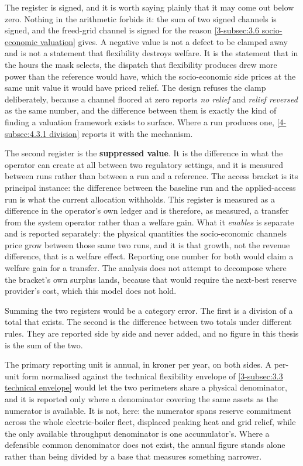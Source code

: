 The register is signed, and it is worth saying plainly that it may come out below zero. Nothing in the arithmetic forbids it: the sum of two signed channels is signed, and the freed-grid channel is signed for the reason \autoref{3-subsec:3.6 socio-economic valuation} gives. A negative value is not a defect to be clamped away and is not a statement that flexibility destroys welfare. It is the statement that in the hours the mask selects, the dispatch that flexibility produces drew more power than the reference would have, which the socio-economic side prices at the same unit value it would have priced relief. The design refuses the clamp deliberately, because a channel floored at zero reports \emph{no relief} and \emph{relief reversed} as the same number, and the difference between them is exactly the kind of finding a valuation framework exists to surface. Where a run produces one, \autoref{4-subsec:4.3.1 division} reports it with the mechanism.

The second register is the \textbf{suppressed value}. It is the difference in what the operator can create at all between two regulatory settings, and it is measured between runs rather than between a run and a reference. The access bracket is its principal instance: the difference between the baseline run and the applied-access run is what the current allocation withholds. This register is measured as a difference in the operator's own ledger and is therefore, as measured, a transfer from the system operator rather than a welfare gain. What it \emph{enables} is separate and is reported separately: the physical quantities the socio-economic channels price grow between those same two runs, and it is that growth, not the revenue difference, that is a welfare effect. Reporting one number for both would claim a welfare gain for a transfer. The analysis does not attempt to decompose where the bracket's own surplus lands, because that would require the next-best reserve provider's cost, which this model does not hold.

Summing the two registers would be a category error. The first is a division of a total that exists. The second is the difference between two totals under different rules. They are reported side by side and never added, and no figure in this thesis is the sum of the two.

The primary reporting unit is annual, in kroner per year, on both sides. A per-unit form normalised against the technical flexibility envelope of \autoref{3-subsec:3.3 technical envelope} would let the two perimeters share a physical denominator, and it is reported only where a denominator covering the same assets as the numerator is available. It is not, here: the numerator spans reserve commitment across the whole electric-boiler fleet, displaced peaking heat and grid relief, while the only available throughput denominator is one accumulator's. Where a defensible common denominator does not exist, the annual figure stands alone rather than being divided by a base that measures something narrower.

